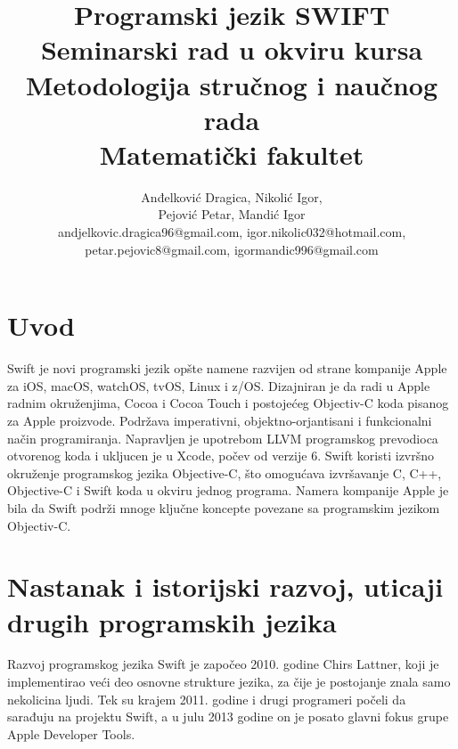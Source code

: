 \documentclass[a4paper]{article}
\begin{document}
\title{Programski jezik SWIFT\\ \small{Seminarski rad u okviru kursa\\Metodologija stručnog i naučnog rada\\ Matematički fakultet}}

\author{Anđelković Dragica, Nikolić Igor,\\Pejović Petar, Mandić Igor\\ andjelkovic.dragica96@gmail.com, igor.nikolic032@hotmail.com,\\ petar.pejovic8@gmail.com, igormandic996@gmail.com}


\maketitle



\tableofcontents

\newpage

\section{Uvod}
\label{sec:uvod}
Swift je novi programski jezik  opšte namene razvijen od strane kompanije Apple za iOS, macOS, watchOS, tvOS, Linux i z/OS. Dizajniran je da radi u Apple radnim okruženjima, Cocoa i Cocoa Touch i  postojećeg Objectiv-C koda pisanog za Apple proizvode. Podržava imperativni, objektno-orjantisani i funkcionalni način programiranja. Napravljen je upotrebom LLVM programskog prevodioca otvorenog koda i ukljucen je u Xcode, počev od verzije 6. Swift koristi izvršno okruženje programskog jezika Objective-C, što omogućava izvršavanje C, C++, Objective-C i Swift koda u okviru jednog programa.
Namera kompanije Apple je bila  da Swift podrži mnoge ključne koncepte povezane sa programskim jezikom Objectiv-C.




\section{Nastanak i istorijski razvoj, uticaji drugih programskih jezika}
\label{sec:prviDeo}

Razvoj programskog jezika Swift je započeo 2010. godine Chirs Lattner, koji je implementirao veći deo osnovne strukture jezika, za čije je postojanje znala samo nekolicina ljudi. Tek su krajem 2011. godine i drugi programeri počeli da sarađuju na projektu Swift, a u julu 2013 godine on je posato glavni fokus grupe Apple Developer Tools.
\end{document}
